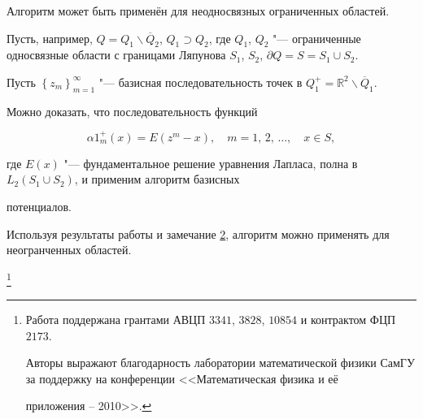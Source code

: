 \hypertarget{lzn:2}{}



\begin{remark}[2]

Алгоритм может быть применён для неодносвязных ограниченных областей. 

Пусть, например, $Q=Q_1 \backslash  \overline{Q}_2$, $Q_1 \supset Q_2$, где $Q_1$, $Q_2$ "--- ограниченные односвязные области с границами Ляпунова $S_1$, $S_2$, \mbox{$ \partial Q{ =} S {=} S_1 \cup S_2$.}

Пусть $\left\{ z_{m} \right\}_{m=1}^{\infty}$ "--- базисная последовательность точек в $Q^{+}_{1} = \mathbb{R}^2 \backslash \overline{Q}_1$. 

Можно доказать, что последовательность функций 

\[

   \alpha1^{+}_m (x) = E(z^m - x), \quad  m=1,\,2,\,\ldots, \quad x \in S,

\]

где $E(x)$ "--- фундаментальное решение уравнения Лапласа, полна в $L_2 (S_1 \cup S_2)$, и применим алгоритм базисных

потенциалов.

\end{remark}



\begin{remark}[3]

Используя результаты работы \cite{lezh:LzhMrk:bib:NSh} и замечание \hyperlink{lzn:2}{2}, алгоритм можно применять для неогранченных областей.

\end{remark}



\thanks{ Работа поддержана грантами АВЦП $3341$, $3828$, $10854$ и контрактом ФЦП $2173$.

Авторы выражают благодарность лаборатории математической физики СамГУ за поддержку на конференции <<Математическая физика и её

приложения – 2010>>.}



